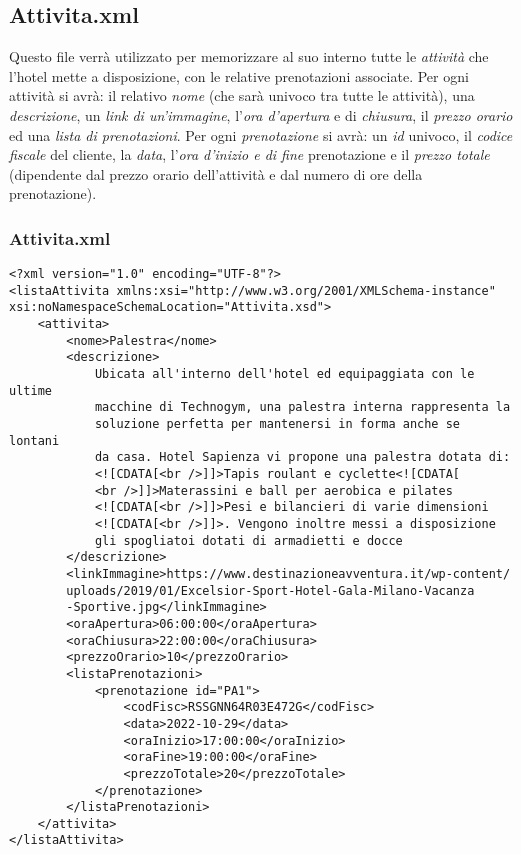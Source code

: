 \documentclass [a4paper, 12pt]{book}
\begin{document}
\subsection{Attivita.xml}
Questo file verrà utilizzato per memorizzare al suo interno tutte le \textit{attività} che l'hotel mette a disposizione, con le relative prenotazioni associate. Per ogni attività si avrà: il relativo \textit{nome} (che sarà univoco tra tutte le attività), una \textit{descrizione}, un \textit{link di un'immagine}, l'\textit{ora d'apertura} e di \textit{chiusura}, il \textit{prezzo orario} ed una \textit{lista di prenotazioni}. Per ogni \textit{prenotazione} si avrà: un \textit{id} univoco, il \textit{codice fiscale} del cliente, la \textit{data}, l'\textit{ora d'inizio e di fine} prenotazione e il \textit{prezzo totale} (dipendente dal prezzo orario dell'attività e dal numero di ore della prenotazione).

\subsubsection{Attivita.xml}
\begin{lstlisting}[style=XML]
<?xml version="1.0" encoding="UTF-8"?>
<listaAttivita xmlns:xsi="http://www.w3.org/2001/XMLSchema-instance" xsi:noNamespaceSchemaLocation="Attivita.xsd">
    <attivita>
        <nome>Palestra</nome>
        <descrizione>
            Ubicata all'interno dell'hotel ed equipaggiata con le ultime
            macchine di Technogym, una palestra interna rappresenta la
            soluzione perfetta per mantenersi in forma anche se lontani
            da casa. Hotel Sapienza vi propone una palestra dotata di:
            <![CDATA[<br />]]>Tapis roulant e cyclette<![CDATA[
            <br />]]>Materassini e ball per aerobica e pilates
            <![CDATA[<br />]]>Pesi e bilancieri di varie dimensioni
            <![CDATA[<br />]]>. Vengono inoltre messi a disposizione
            gli spogliatoi dotati di armadietti e docce
        </descrizione>
        <linkImmagine>https://www.destinazioneavventura.it/wp-content/
        uploads/2019/01/Excelsior-Sport-Hotel-Gala-Milano-Vacanza
        -Sportive.jpg</linkImmagine>
        <oraApertura>06:00:00</oraApertura>
        <oraChiusura>22:00:00</oraChiusura>
        <prezzoOrario>10</prezzoOrario>
        <listaPrenotazioni>
            <prenotazione id="PA1">
                <codFisc>RSSGNN64R03E472G</codFisc>
                <data>2022-10-29</data>
                <oraInizio>17:00:00</oraInizio>
                <oraFine>19:00:00</oraFine>
                <prezzoTotale>20</prezzoTotale>
            </prenotazione>
        </listaPrenotazioni>
    </attivita>
</listaAttivita>
\end{lstlisting}
\end{document}
